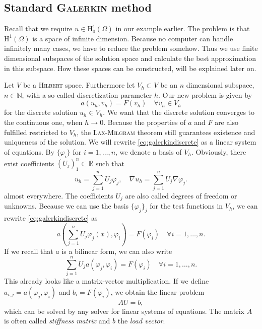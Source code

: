 \documentclass[12pt,a4paper,twoside, open=right]{scrreprt}
\theoremstyle{definition}
\theoremstyle{plain}
\newcommand{\rr}{\mathbb{R}}
\newcommand{\nn}{\mathbb{N}}
\begin{document}
\subsection{Standard \textsc{Galerkin} method}
 Recall that we require $u\in \mathrm{H}^1_0(\Omega)$ in our example earlier. The problem is that $\mathrm{H}^1(\Omega)$ is a space of infinite dimension. Because no computer can handle infinitely many cases, we have to reduce the problem somehow. Thus we use finite dimensional subspaces of the solution space and calculate the best approximation in this subspace. How these spaces can be constructed, will be explained later on. 
\par 
Let $V$ be a \textsc{Hilbert} space. Furthermore let $V_h\subset V$ be an $n$ dimensional subspace, $n\in\nn$, with a so called discretization parameter $h$.
Our new problem is given by
\begin{equation}
a(u_h,v_h) = F(v_h) \quad \forall v_h\in V_h \label{eq:galerkindiscrete}
\end{equation}
for the discrete solution $u_h\in V_h$. We want that the discrete solution converges to the continuous one, when $h\to 0$. Because the properties of $a$ and $F$ are also fulfilled restricted to $V_h$, the \textsc{Lax-Milgram} theorem still guarantees existence and uniqueness of the solution. 
We will rewrite \eqref{eq:galerkindiscrete} as a linear system of equations. By $\{\varphi_i\}$ for $i=1,\dotsc,n$, we denote a basis of $V_h$. Obviously, there exist coefficients $(U_j)_1^n\subset\rr$ such that
\begin{equation}
    u_h=\sum_{j=1}^{n}U_j\varphi_j,\quad \nabla u_h=\sum_{j=1}^{n}U_j\nabla\varphi_j.
\end{equation}
almost everywhere. The coefficients $U_j$ are also called degrees of freedom or unknowns. Because we can use the basis $\{\varphi_j\}_j$ for the test functions in $V_h$, we can rewrite \eqref{eq:galerkindiscrete} as 
\begin{equation}
    a\left(\sum_{j=1}^{n}U_j\varphi_j(x),\varphi_i\right)= F(\varphi_i)\quad \forall i=1,\dotsc,n.
\end{equation}
If we recall that $a$ is a bilinear form, we can also write
\begin{equation}
    \sum_{j=1}^{n}U_ja(\varphi_j,\varphi_i)=F(\varphi_i) \quad\forall i=1,\dotsc,n.
\end{equation}
This already looks like a matrix-vector multiplication. If we define $a_{i,j}=a(\varphi_j,\varphi_i)$ and $b_i=F(\varphi_i)$, we obtain the linear problem
\begin{equation}
    AU=b,
\end{equation} which can be solved by any solver for linear systems of equations. The matrix $A$ is often called \emph{stiffness matrix} and $b$ the \emph{load vector}.
\end{document}
